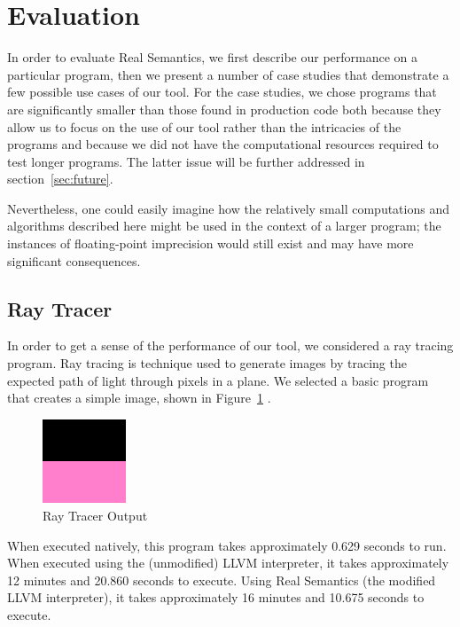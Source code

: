 \section{Evaluation}

In order to evaluate Real Semantics, we first describe our performance on a particular program, then we present a number of case studies that demonstrate a few possible use cases of our tool. For the case studies, we chose programs that are significantly smaller than those found in production code both because they allow us to focus on the use of our tool rather than the intricacies of the programs and because we did not have the computational resources required to test longer programs. The latter issue will be further addressed in section~\ref{sec:future}.

Nevertheless, one could easily imagine how the relatively small computations and algorithms described here might be used in the context of a larger program; the instances of floating-point imprecision would still exist and may have more significant consequences.

\subsection{Ray Tracer}

In order to get a sense of the performance of our tool, we considered a ray tracing program. Ray tracing is technique used to generate images by tracing the expected path of light through pixels in a plane. We selected a basic program that creates a simple image, shown in Figure~\ref{fig:ray} \cite{raytracer}.

\begin{figure}[t!]
\centering
\includegraphics[width=2.5cm]{ray.png}
\caption{Ray Tracer Output}
\label{fig:ray}
\end{figure}

When executed natively, this program takes approximately 0.629 seconds to run. When executed using the (unmodified) LLVM interpreter, it takes approximately 12 minutes and 20.860 seconds to execute. Using Real Semantics (the modified LLVM interpreter), it takes approximately 16 minutes and 10.675 seconds to execute.

